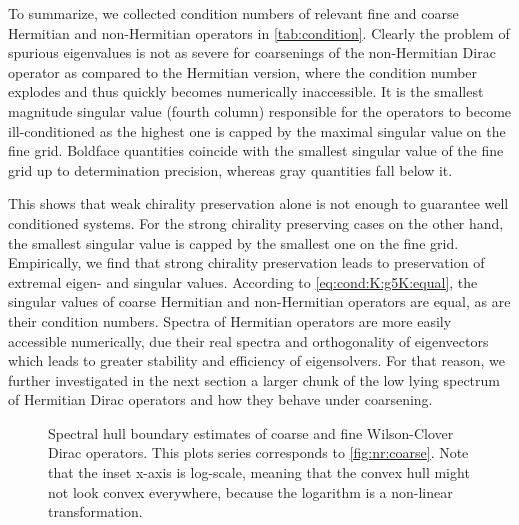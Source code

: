 To summarize, we collected condition numbers of relevant fine and coarse Hermitian and non-Hermitian operators in \cref{tab:condition}.
Clearly the problem of spurious eigenvalues is not as severe for coarsenings of the non-Hermitian Dirac operator as compared to the Hermitian version, where the condition number explodes and thus quickly becomes numerically inaccessible.
It is the smallest magnitude singular value (fourth column) responsible for the operators to become ill-conditioned as the highest one is capped by the maximal singular value on the fine grid.
Boldface quantities coincide with the smallest singular value of the fine grid up to determination precision, whereas gray quantities fall below it.

This shows that weak chirality preservation alone is not enough to guarantee well conditioned systems.
For the strong chirality preserving cases on the other hand, the smallest singular value is capped by the smallest one on the fine grid.
Empirically, we find that strong chirality preservation leads to preservation of extremal eigen- and singular values.
According to \cref{eq:cond:K:g5K:equal}, the singular values of coarse Hermitian and non-Hermitian operators are equal, as are their condition numbers.
Spectra of Hermitian operators are more easily accessible numerically, due their real spectra and orthogonality of eigenvectors which leads to greater stability and efficiency of eigensolvers.
For that reason, we further investigated in the next section a larger chunk of the low lying spectrum of Hermitian Dirac operators and how they behave under coarsening.

\begin{figure}
\centering

\hfill
{}

\hfill
{}

\caption{
Spectral hull boundary estimates of coarse and fine Wilson-Clover Dirac operators.
This plots series corresponds to \cref{fig:nr:coarse}.
Note that the inset x-axis is log-scale, meaning that the convex hull might not look convex everywhere, because the logarithm is a non-linear transformation.
}
\label{fig:ch:coarse}
\end{figure}

